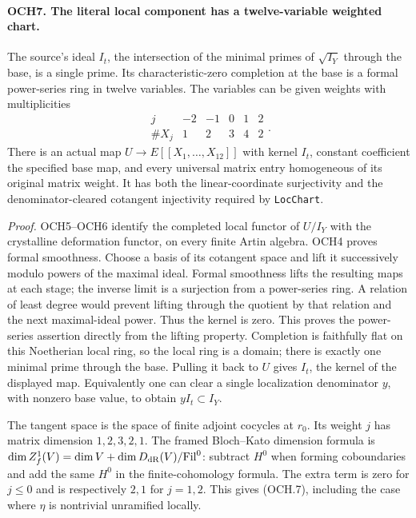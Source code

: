 \documentclass[11pt,a4paper]{article}
\numberwithin{equation}{section}
\theoremstyle{remark}\newtheorem{remark}[theorem]{Remark}
\begin{document}
\paragraph{OCH7. The literal local component has a twelve-variable weighted chart.}
\label{claim:OCH7}
The source's ideal \(I_t\), the intersection of the minimal primes
of \(\sqrt{I_Y}\) through the base, is a single prime.  Its
characteristic-zero completion at the base is a formal power-series
ring in twelve variables.  The variables can be given weights with
multiplicities
\[
 \begin{array}{c|rrrrr}j&-2&-1&0&1&2\\\hline
                   \#X_j&1&2&3&4&2\end{array}.
 \tag{OCH.7}
\]
There is an actual map
\(U\to E[[X_1,\ldots,X_{12}]]\) with kernel \(I_t\),
constant coefficient the specified base map, and every universal
matrix entry homogeneous of its original matrix weight.  It has
both the linear-coordinate surjectivity and the denominator-cleared
cotangent injectivity required by \texttt{Loc\allowbreak Chart}.

\emph{Proof.}
OCH5--OCH6 identify the completed local functor of \(U/I_Y\)
with the crystalline deformation functor, on every finite Artin
algebra.  OCH4 proves formal smoothness.  Choose a basis of its
cotangent space and lift it successively modulo powers of the maximal
ideal.  Formal smoothness lifts the resulting maps at each stage;
the inverse limit is a surjection from a power-series ring.  A
relation of least degree would prevent lifting through the quotient
by that relation and the next maximal-ideal power.  Thus the kernel
is zero.  This proves the power-series assertion directly from the
lifting property.  Completion is faithfully flat on this Noetherian
local ring, so the local ring is a domain; there is exactly one
minimal prime through the base.  Pulling it back to \(U\) gives
\(I_t\), the kernel of the displayed map.  Equivalently one can
clear a single localization denominator \(y\), with nonzero base
value, to obtain \(yI_t\subset I_Y\).

The tangent space is the space of finite adjoint cocycles at \(r_0\).
Its weight \(j\) has matrix dimension \(1,2,3,2,1\).
The framed Bloch--Kato dimension formula is
\(\dim Z^1_f(V)=\dim V+\dim D_{\rm dR}(V)/\mathrm{Fil}^0\):
subtract \(H^0\) when forming coboundaries and add the same
\(H^0\) in the finite-cohomology formula.  The extra term is
zero for \(j\le0\) and is respectively \(2,1\) for
\(j=1,2\).  This gives (OCH.7), including the case where
\(\eta\) is nontrivial unramified locally.
\end{document}
